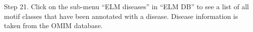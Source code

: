 Step 21. Click on the sub-menu ``ELM diseases'' in ``ELM DB'' to see a
list of all motif classes that have been annotated with a disease.
Disease information is taken from the OMIM database.


